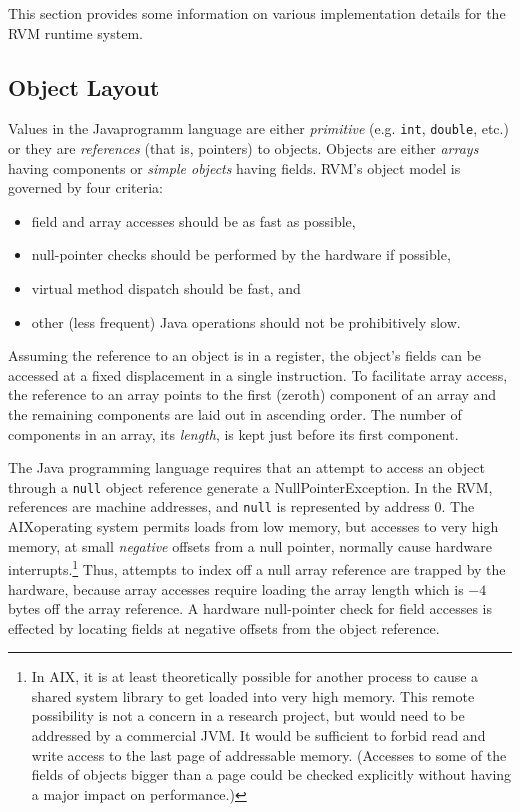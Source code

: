 This section provides some information on various
implementation details for the RVM runtime system.

\subsection{Object Layout} \label{sssec:objects}
Values in the Java\trademark programm language are either {\em
primitive} (e.g. {\tt int}, 
{\tt double}, etc.)  or they are {\em references} (that is, pointers) to
objects.  Objects are either {\em arrays} having components or {\em
simple objects} having fields.  RVM's object model is governed by four
criteria: 
\begin{itemize}
\item{}
field and array accesses should be as fast as possible,
\item{}
null-pointer checks should be performed by the hardware if possible, 
\item{}
virtual method dispatch should be fast, and 
\item{}
other (less frequent) Java operations  should not be prohibitively slow.
\end{itemize}

Assuming the reference to an object is in a register, the object's
fields can be accessed at a fixed displacement in a single
instruction.  To facilitate array access, the reference to an array
points to the first (zeroth) component of an array and the remaining
components are laid out in ascending order.  The number of components
in an array, its {\em length}, is kept just before its first
component.

The Java programming language requires that an attempt to access an
object through a {\tt null} 
object reference generate a NullPointerException.  In the RVM, references
are machine addresses, and {\tt null} is represented by address $0$.
The AIX\AIXTMFootnote operating system permits loads from low memory,
but accesses 
to very high memory, at small {\em negative} offsets from a null
pointer, normally cause hardware interrupts.\footnote{In AIX, it is at
least theoretically possible for another process to cause a shared
system library to get loaded into very high memory.  This remote
possibility is not a concern in a research project, but would need to
be addressed by a commercial JVM.  It would be sufficient to forbid
read and write access to the last page of addressable memory.
(Accesses to some of the fields of objects bigger than a page could be
checked explicitly without having a major impact on performance.)}
Thus, attempts to index off a null array reference are trapped by
the hardware, because array accesses require loading the array length
which is $-4$ bytes off the array reference.  A hardware null-pointer
check for field accesses is effected by locating fields at negative
offsets from the object reference.

